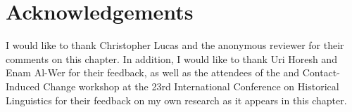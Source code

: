 \documentclass[output=paper]{langsci/langscibook}
\begin{document}
\section*{Acknowledgements}

I would like to thank Christopher Lucas and the anonymous reviewer for their comments on this chapter. In addition, I would like to thank Uri Horesh and Enam Al-Wer for their feedback, as well as the attendees of the  and Contact-Induced Change workshop at the 23rd International Conference on Historical Linguistics for their feedback on my own research as it appears in this chapter. 



\sloppy
\printbibliography[heading=subbibliography,notkeyword=this]
\end{document}

